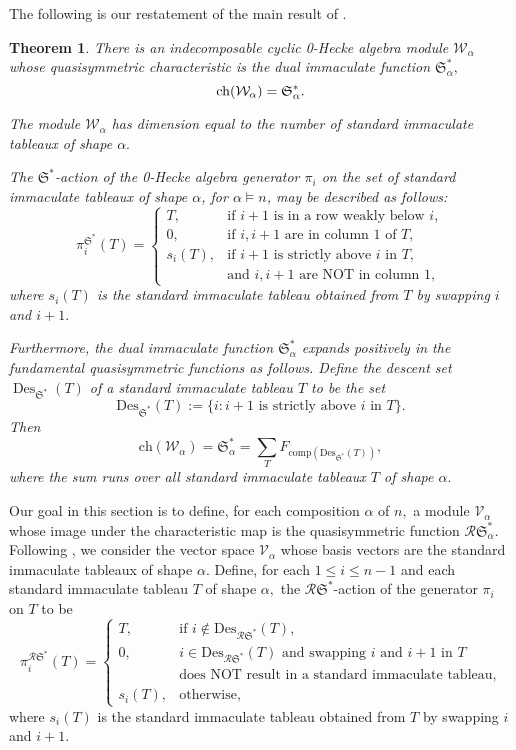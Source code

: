 \documentclass[12pt,letterpaper]{amsart}
\newtheorem{theorem}{Theorem}[section]
\theoremstyle{definition}
\newcommand{\dI}{\mathfrak{S}^*}
\newcommand{\rdI}{\mathcal{R}\mathfrak{S}^*}
\DeclareMathOperator{\Des}{Des}
\begin{document}
The following is our restatement of the main result of \cite{BBSSZ2015}.
\begin{theorem}\label{thm:BBSSZ2dualImm}\cite[Theorem 3.12]{BBSSZ2015} There is an indecomposable cyclic 0-Hecke algebra module $\mathcal{W}_\alpha$ whose quasisymmetric characteristic is the dual immaculate function $\dI_\alpha, $  
\[ \chr(\mathcal{W}_\alpha)= \dI_\alpha.\]

The module $\mathcal{W}_\alpha$ has dimension equal to the number of standard immaculate tableaux of shape $\alpha.$

The $\dI$-action of the  0-Hecke algebra generator $\pi_i$  on the set of standard immaculate tableaux of shape $\alpha$,  for $\alpha\vDash n$, may be described as follows:
\begin{equation}\label{eqn:defn-dualImm-pi(T)}\pi_i^{\dI}(T)=\begin{cases} T, &\text{if $i+1$ is in a row weakly below }i,\\
0,  & \text{if $i,i+1$ are in column 1 of } T,\\
s_i(T), & \text{if $i+1$ is strictly above $i$ in $T$},\\ &\text{and $i,i+1$ are NOT in column 1},
\end{cases}\end{equation}
where $s_i(T)$ is the standard immaculate tableau obtained from $T$ by swapping $i$ and $i+1.$ 

Furthermore, the dual immaculate function $\dI_\alpha$ expands positively in the fundamental quasisymmetric functions as follows.  Define the descent set $\Des_{\dI}(T)$ of a standard immaculate tableau $T$ to be the set 
\[\mathrm{Des}_{\dI}(T):=\{i: i+1 \text{ is strictly above } i \text{ in } T\}.\]
Then 
\[\mathrm{ch}(\mathcal{W}_\alpha)=\dI_\alpha=\sum_T F_{\mathrm{comp}(\mathrm{Des}_{\dI}(T))},\]
where the sum runs over all standard immaculate tableaux $T$ of shape $\alpha.$
\end{theorem}

Our goal in this section is to define, for each composition $\alpha$ of $n,$ a module $\mathcal{V}_\alpha$ whose image under the characteristic map is the quasisymmetric function $\mathcal{R}\mathfrak{S}^*_\alpha.$  Following \cite{BBSSZ2015}, we consider the vector space 
$\mathcal{V}_\alpha$ whose basis vectors are the standard immaculate tableaux of shape $\alpha.$ 
Define, for each $1\le i\le n-1$ and each standard immaculate tableau $T$ of shape $\alpha,$ the $\rdI$-action of the generator $\pi_i$ on $T$ to be 
\begin{equation}\label{eqn:defn-RSdualImm-pi(T)}\pi_i^{\rdI}(T)=\begin{cases} T, &\text{if } 
i\notin \mathrm{Des}_{\mathcal{R}\mathfrak{S^*}}(T), \\
0,& i\in \mathrm{Des}_{\mathcal{R}\mathfrak{S^*}}(T) \text{ and swapping } i \text{ and } i+1 \text{ in } T \\
\phantom{0,} & \text{does NOT result in a standard immaculate tableau},\\
s_i(T), & \text{otherwise},
\end{cases}\end{equation}
where $s_i(T)$ is the standard immaculate tableau obtained from $T$ by swapping $i$ and $i+1.$ 
\end{document}
